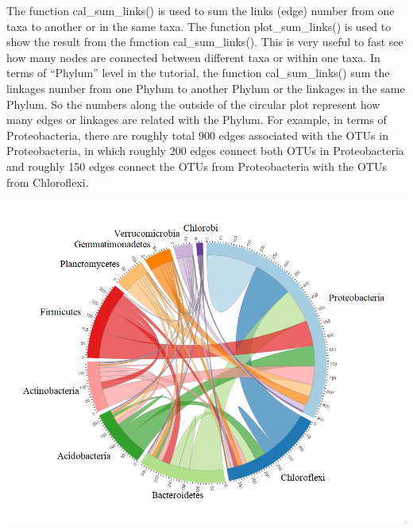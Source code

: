 \documentclass[
]{book}
\newenvironment{Shaded}{\begin{snugshade}}{\end{snugshade}}
\newcommand{\AttributeTok}[1]{\textcolor[rgb]{0.77,0.63,0.00}{#1}}
\newcommand{\CommentTok}[1]{\textcolor[rgb]{0.56,0.35,0.01}{\textit{#1}}}
\newcommand{\ConstantTok}[1]{\textcolor[rgb]{0.00,0.00,0.00}{#1}}
\newcommand{\DecValTok}[1]{\textcolor[rgb]{0.00,0.00,0.81}{#1}}
\newcommand{\FunctionTok}[1]{\textcolor[rgb]{0.00,0.00,0.00}{#1}}
\newcommand{\NormalTok}[1]{#1}
\newcommand{\SpecialCharTok}[1]{\textcolor[rgb]{0.00,0.00,0.00}{#1}}
\newcommand{\StringTok}[1]{\textcolor[rgb]{0.31,0.60,0.02}{#1}}
\begin{document}
The function cal\_sum\_links() is used to sum the links (edge) number from one taxa to another or in the same taxa.
The function plot\_sum\_links() is used to show the result from the function cal\_sum\_links().
This is very useful to fast see how many nodes are connected between different taxa or within one taxa.
In terms of ``Phylum'' level in the tutorial,
the function cal\_sum\_links() sum the linkages number from one Phylum to another Phylum or the linkages in the same Phylum.
So the numbers along the outside of the circular plot represent how many edges or linkages are related with the Phylum.
For example, in terms of Proteobacteria,
there are roughly total 900 edges associated with the OTUs in Proteobacteria,
in which roughly 200 edges connect both OTUs in Proteobacteria and roughly 150 edges connect the OTUs from Proteobacteria with the OTUs from Chloroflexi.

\begin{Shaded}
\end{Shaded}

\begin{center}\includegraphics[width=700px]{Images/plot_sum_links} \end{center}
\end{document}
